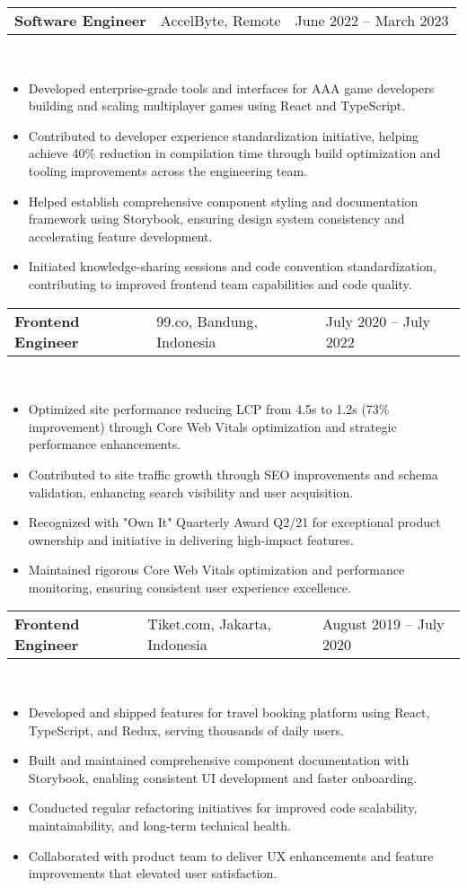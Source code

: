 \documentclass[a4paper, 11pt]{article}
\newcommand{\resumeItem}[1]{
  \item\small{
    {#1 \vspace{-2pt}}
  }
}
\newcommand{\resumeSubheading}[4]{
  \vspace{-2pt}\item
    \begin{tabularx}{0.987\textwidth}[t]{
  >{\raggedright\arraybackslash}X
  >{\centering\arraybackslash}X
  >{\raggedleft\arraybackslash}X }
      \textbf{#1} & #2 & #3 \\
    \end{tabularx}
    \textit{\small#4}\\
    \vspace{-7pt}
}
\newcommand{\resumeItemListStart}{\begin{itemize}[leftmargin=0.22in]}
\newcommand{\resumeItemListEnd}{\end{itemize}\vspace{-20pt}}
\begin{document}
        \resumeSubheading
            {Software Engineer}{AccelByte, Remote}{June 2022 -- March 2023}{}
            \resumeItemListStart
                \resumeItem{Developed enterprise-grade tools and interfaces for AAA game developers building and scaling multiplayer games using React and TypeScript.}
                \resumeItem{Contributed to developer experience standardization initiative, helping achieve 40\% reduction in compilation time through build optimization and tooling improvements across the engineering team.}
                \resumeItem{Helped establish comprehensive component styling and documentation framework using Storybook, ensuring design system consistency and accelerating feature development.}
                \resumeItem{Initiated knowledge-sharing sessions and code convention standardization, contributing to improved frontend team capabilities and code quality.}
            \resumeItemListEnd

        \resumeSubheading
            {Frontend Engineer}{99.co, Bandung, Indonesia}{July 2020 -- July 2022}{}
            \resumeItemListStart
                \resumeItem{Optimized site performance reducing LCP from 4.5s to 1.2s (73\% improvement) through Core Web Vitals optimization and strategic performance enhancements.}
                \resumeItem{Contributed to site traffic growth through SEO improvements and schema validation, enhancing search visibility and user acquisition.}
                \resumeItem{Recognized with "Own It" Quarterly Award Q2/21 for exceptional product ownership and initiative in delivering high-impact features.}
                \resumeItem{Maintained rigorous Core Web Vitals optimization and performance monitoring, ensuring consistent user experience excellence.}
            \resumeItemListEnd

        \resumeSubheading
            {Frontend Engineer}{Tiket.com, Jakarta, Indonesia}{August 2019 -- July 2020}{}
            \resumeItemListStart
                \resumeItem{Developed and shipped features for travel booking platform using React, TypeScript, and Redux, serving thousands of daily users.}
                \resumeItem{Built and maintained comprehensive component documentation with Storybook, enabling consistent UI development and faster onboarding.}
                \resumeItem{Conducted regular refactoring initiatives for improved code scalability, maintainability, and long-term technical health.}
                \resumeItem{Collaborated with product team to deliver UX enhancements and feature improvements that elevated user satisfaction.}
            \resumeItemListEnd
\end{document}
